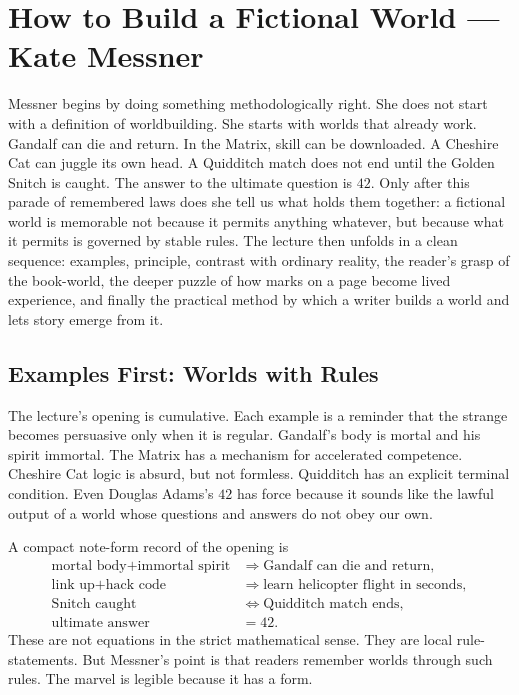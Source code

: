 \chapter{How to Build a Fictional World --- Kate Messner}

Messner begins by doing something methodologically right. She does not start with a definition of worldbuilding. She starts with worlds that already work. Gandalf can die and return. In the Matrix, skill can be downloaded. A Cheshire Cat can juggle its own head. A Quidditch match does not end until the Golden Snitch is caught. The answer to the ultimate question is \(42\). Only after this parade of remembered laws does she tell us what holds them together: a fictional world is memorable not because it permits anything whatever, but because what it permits is governed by stable rules. The lecture then unfolds in a clean sequence: examples, principle, contrast with ordinary reality, the reader's grasp of the book-world, the deeper puzzle of how marks on a page become lived experience, and finally the practical method by which a writer builds a world and lets story emerge from it.

\section{Examples First: Worlds with Rules}

The lecture's opening is cumulative. Each example is a reminder that the strange becomes persuasive only when it is regular. Gandalf's body is mortal and his spirit immortal. The Matrix has a mechanism for accelerated competence. Cheshire Cat logic is absurd, but not formless. Quidditch has an explicit terminal condition. Even Douglas Adams's \(42\) has force because it sounds like the lawful output of a world whose questions and answers do not obey our own.

A compact note-form record of the opening is
\begin{align}
\text{mortal body} + \text{immortal spirit} &\Rightarrow \text{Gandalf can die and return},\\
\text{link up} + \text{hack code} &\Rightarrow \text{learn helicopter flight in seconds},\\
\text{Snitch caught} &\iff \text{Quidditch match ends},\\
\text{ultimate answer} &= 42.
\end{align}
These are not equations in the strict mathematical sense. They are local rule-statements. But Messner's point is that readers remember worlds through such rules. The marvel is legible because it has a form.

